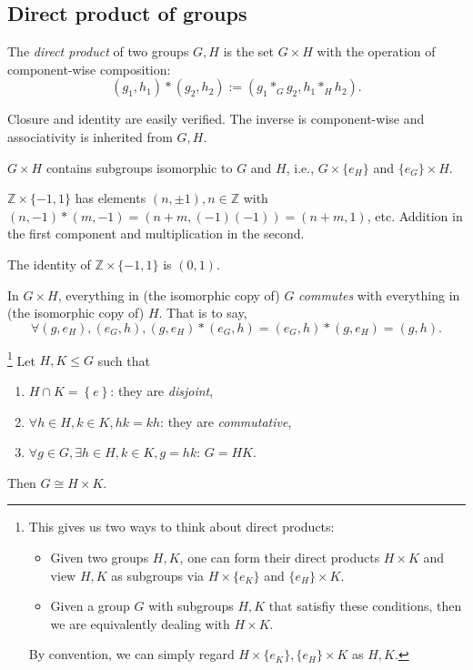 \documentclass[a4paper]{article}
\begin{document}
\subsection{Direct product of groups}
\begin{definition}
  The \textit{direct product} of two groups $ G,H $ is the set $
  G\times H $ with the operation of component-wise composition:
  \[
    (g_1,h_1) * (g_2,h_2):=(g_1*_G g_2, h_1 *_H h_2)
  .\]
\end{definition}
Closure and identity are easily verified. The inverse is
component-wise and associativity is inherited from $G,H$.
\begin{remark}
  $ G\times H $ contains subgroups isomorphic to $G$ and $H$, i.e., $
  G \times \{e_H\} $ and $ \{e_G\} \times H $.
\end{remark}
\begin{example}
  $ \mathbb{Z} \times \{-1,1\} $ has elements $ (n,\pm 1), n\in
  \mathbb{Z} $ with $ (n,-1)*(m,-1)=(n+m,(-1)(-1))=(n+m,1) $, etc.
  Addition in the first component and multiplication in the second.

  The identity of $\mathbb{Z} \times \{-1,1\}$ is $(0,1)$.
\end{example}
\begin{remark}
  In $ G \times H $, everything in (the isomorphic copy of) $G$
  \textit{commutes} with everything in (the isomorphic copy of) $H$.
  That is to say,
  \[
    \forall (g,e_H), (e_G,h), (g,e_H)*(e_G,h) = (e_G, h)*(g,e_H)=(g,h)
  .\]
\end{remark}
\begin{theorem}\label{thm:Direct Product Theorem}
  \footnote{This gives us two ways to think about direct products:
    \begin{itemize}
      \item Given two groups $H,K$, one can form their direct
        products $ H \times K $ and view $H,K$ as subgroups via $ H
        \times \{e_K\} $ and $ \{e_H\}\times K $.
      \item Given a group $G$ with subgroups $H,K$ that satisfiy
        these conditions, then we are equivalently dealing with $ H \times K $.
    \end{itemize}
    By convention, we can simply regard $ H \times
  \{e_K\},\{e_H\}\times K $ as $ H,K. $}
  Let $ H,K\le G $ such that
  \begin{enumerate}[(1)]
    \item $ H \cap K=\left\{ e\right\} $: they are \textit{disjoint},
    \item $ \forall h\in H,k\in K, hk=kh $: they are \textit{commutative},
    \item $ \forall g\in G, \exists h\in H, k\in K, g=hk $: $ G=HK $.
  \end{enumerate}
  Then $ G \cong H \times K $.
\end{theorem}
\end{document}
